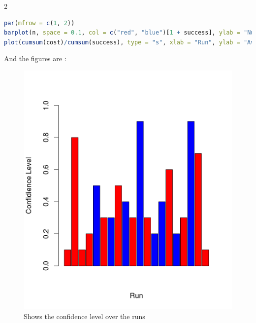 \documentclass{article}
\begin{document}
\begin{multicols*}{2}
\begin{flushleft}
\begin{flushleft}
\begin{lstlisting}[language=R]
par(mfrow = c(1, 2))
barplot(n, space = 0.1, col = c("red", "blue")[1 + success], ylab = "Number of measurements", ylim=c(0, 100),  xlab = "Run")
plot(cumsum(cost)/cumsum(success), type = "s", xlab = "Run", ylab = "Average cost")
\end{lstlisting}
And the figures are : 
\begin{figure}[H]
\begin{center}
\includegraphics[scale=0.4]{plotm2confidence.png}
\end{center}
\caption{Shows the confidence level over the runs}
\end{figure}


\end{flushleft}
\end{flushleft}
\end{multicols*}
\end{document}
